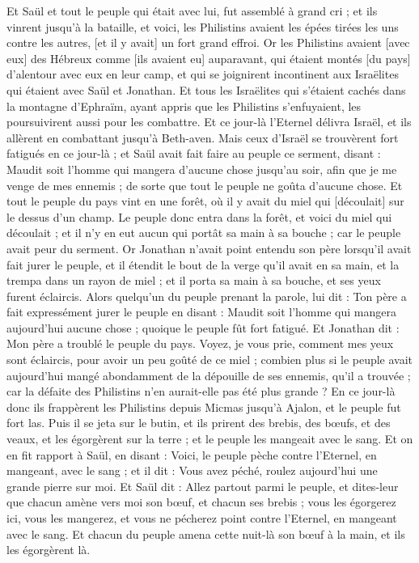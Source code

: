 \begin{multicols}{2}
Et Saül et tout le peuple qui était avec lui, fut assemblé à grand cri ; et ils vinrent jusqu'à la bataille, et voici, les Philistins avaient les épées tirées les uns contre les autres, [et il y avait] un fort grand effroi.
Or les Philistins avaient [avec eux] des Hébreux comme [ils avaient eu] auparavant, qui étaient montés [du pays] d'alentour avec eux en leur camp, et qui se joignirent incontinent aux Israëlites qui étaient avec Saül et Jonathan.
Et tous les Israëlites qui s'étaient cachés dans la montagne d'Ephraïm, ayant appris que les Philistins s'enfuyaient, les poursuivirent aussi pour les combattre.
Et ce jour-là l'Eternel délivra Israël, et ils allèrent en combattant jusqu'à Beth-aven.
Mais ceux d'Israël se trouvèrent fort fatigués en ce jour-là ; et Saül avait fait faire au peuple ce serment, disant : Maudit soit l'homme qui mangera d'aucune chose jusqu'au soir, afin que je me venge de mes ennemis ; de sorte que tout le peuple ne goûta d'aucune chose.
Et tout le peuple du pays vint en une forêt, où il y avait du miel qui [découlait] sur le dessus d'un champ.
Le peuple donc entra dans la forêt, et voici du miel qui découlait ; et il n'y en eut aucun qui portât sa main à sa bouche ; car le peuple avait peur du serment.
Or Jonathan n'avait point entendu son père lorsqu'il avait fait jurer le peuple, et il étendit le bout de la verge qu'il avait en sa main, et la trempa dans un rayon de miel ; et il porta sa main à sa bouche, et ses yeux furent éclaircis.
Alors quelqu'un du peuple prenant la parole, lui dit : Ton père a fait expressément jurer le peuple en disant : Maudit soit l'homme qui mangera aujourd'hui aucune chose ; quoique le peuple fût fort fatigué.
Et Jonathan dit : Mon père a troublé le peuple du pays. Voyez, je vous prie, comment mes yeux sont éclaircis, pour avoir un peu goûté de ce miel ;
combien plus si le peuple avait aujourd'hui mangé abondamment de la dépouille de ses ennemis, qu'il a trouvée ; car la défaite des Philistins n'en aurait-elle pas été plus grande ?
En ce jour-là donc ils frappèrent les Philistins depuis Micmas jusqu'à Ajalon, et le peuple fut fort las.
Puis il se jeta sur le butin, et ils prirent des brebis, des bœufs, et des veaux, et les égorgèrent sur la terre ; et le peuple les mangeait avec le sang.
Et on en fit rapport à Saül, en disant : Voici, le peuple pèche contre l'Eternel, en mangeant, avec le sang ; et il dit : Vous avez péché, roulez aujourd'hui une grande pierre sur moi.
Et Saül dit : Allez partout parmi le peuple, et dites-leur que chacun amène vers moi son bœuf, et chacun ses brebis ; vous les égorgerez ici, vous les mangerez, et vous ne pécherez point contre l'Eternel, en mangeant avec le sang. Et chacun du peuple amena cette nuit-là son bœuf à la main, et ils les égorgèrent là.

\end{multicols}
